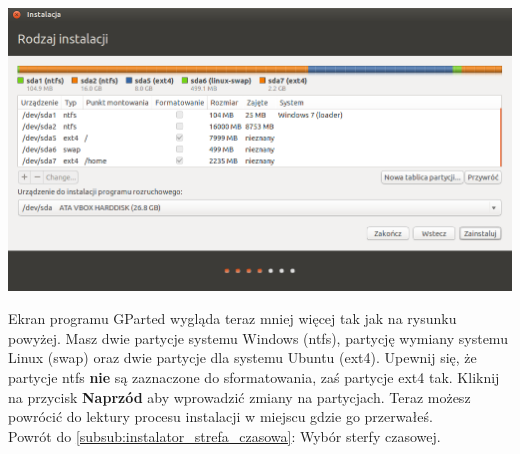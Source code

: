 \begin{center}
	\includegraphics[scale=0.7]{images/instalator_partycjonowanie_gparted4.png}
\end{center}
Ekran programu GParted wygląda teraz mniej więcej tak jak na rysunku powyżej. Masz dwie partycje systemu Windows (ntfs), partycję wymiany systemu Linux (swap) oraz dwie partycje dla systemu Ubuntu (ext4). Upewnij się, że partycje ntfs \textbf{nie} są zaznaczone do sformatowania, zaś partycje ext4 tak. Kliknij na przycisk \textbf{Naprzód} aby wprowadzić zmiany na partycjach. Teraz możesz powrócić do lektury procesu instalacji w miejscu gdzie go przerwałeś.\\
Powrót do \ref{subsub:instalator_strefa_czasowa}: Wybór sterfy czasowej.
\clearpage